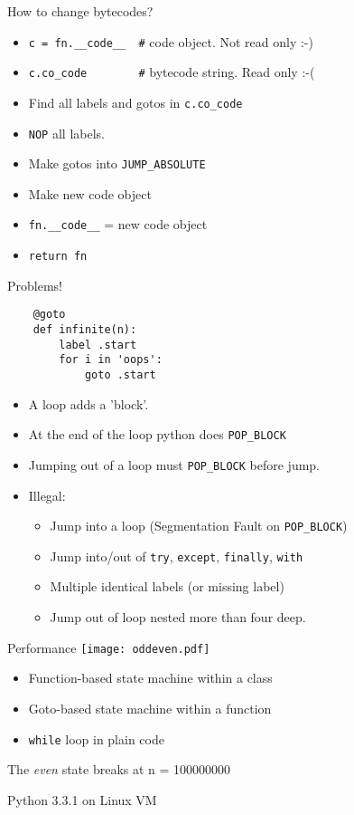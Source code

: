 \documentclass{beamer}
\begin{document}
\begin{frame}[fragile]{How to change bytecodes?}
\begin{itemize}
\item \verb!c = fn.__code__  #! code object. Not read only :-)
\item \verb!c.co_code        #! bytecode string. Read only :-(
\item Find all labels and gotos in \verb!c.co_code!
\item \verb!NOP! all labels.
\item Make gotos into \verb!JUMP_ABSOLUTE!
\item Make new code object
\item \verb!fn.__code__! = new code object
\item \verb!return fn!
\end{itemize}
\end{frame}

\begin{frame}[fragile]{Problems!}
\begin{verbatim}
    @goto
    def infinite(n):
        label .start
        for i in 'oops':
            goto .start
\end{verbatim}

\begin{itemize}
\item A loop adds a 'block'.
\item At the end of the loop python does \verb!POP_BLOCK!
\item Jumping out of a loop must \verb!POP_BLOCK! before jump.
\item Illegal:
\begin{itemize}
\item Jump into a loop (Segmentation Fault on \verb!POP_BLOCK!)
\item Jump into/out of \verb!try!, \verb!except!, \verb!finally!, \verb!with!
\item Multiple identical labels (or missing label)
\item Jump out of loop nested more than four deep.
\end{itemize}
\end{itemize}
\end{frame}

\begin{frame}[fragile]{Performance}
%
\texttt{[image: oddeven.pdf]}

\begin{itemize}
\item Function-based state machine within a class
\item Goto-based state machine within a function
\item \verb!while! loop in plain code
\end{itemize}

The \emph{even} state breaks at n = 100000000

Python 3.3.1 on Linux VM
\end{frame}
\end{document}
